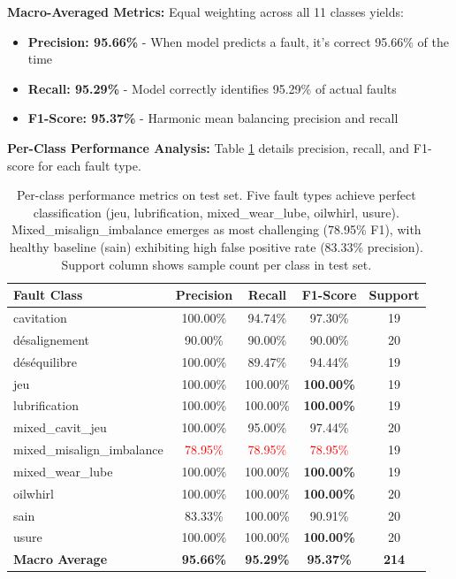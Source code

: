 \documentclass[11pt,a4paper]{article}
\begin{document}
\textbf{Macro-Averaged Metrics:} Equal weighting across all 11 classes yields:
\begin{itemize}[itemsep=0.2em]
    \item \textbf{Precision: 95.66\%} - When model predicts a fault, it's correct 95.66\% of the time
    \item \textbf{Recall: 95.29\%} - Model correctly identifies 95.29\% of actual faults
    \item \textbf{F1-Score: 95.37\%} - Harmonic mean balancing precision and recall
\end{itemize}

\textbf{Per-Class Performance Analysis:} Table \ref{tab:per_class} details precision, recall, and F1-score for each fault type.

\begin{table}[h]
\centering
\small
\begin{tabular}{@{}lcccc@{}}
\toprule
\textbf{Fault Class} & \textbf{Precision} & \textbf{Recall} & \textbf{F1-Score} & \textbf{Support} \\
\midrule
cavitation & 100.00\% & 94.74\% & 97.30\% & 19 \\
désalignement & 90.00\% & 90.00\% & 90.00\% & 20 \\
déséquilibre & 100.00\% & 89.47\% & 94.44\% & 19 \\
jeu & 100.00\% & 100.00\% & \textbf{100.00\%} & 19 \\
lubrification & 100.00\% & 100.00\% & \textbf{100.00\%} & 19 \\
mixed\_cavit\_jeu & 100.00\% & 95.00\% & 97.44\% & 20 \\
mixed\_misalign\_imbalance & \textcolor{red}{78.95\%} & \textcolor{red}{78.95\%} & \textcolor{red}{78.95\%} & 19 \\
mixed\_wear\_lube & 100.00\% & 100.00\% & \textbf{100.00\%} & 19 \\
oilwhirl & 100.00\% & 100.00\% & \textbf{100.00\%} & 20 \\
sain & 83.33\% & 100.00\% & 90.91\% & 20 \\
usure & 100.00\% & 100.00\% & \textbf{100.00\%} & 20 \\
\midrule
\textbf{Macro Average} & \textbf{95.66\%} & \textbf{95.29\%} & \textbf{95.37\%} & \textbf{214} \\
\bottomrule
\end{tabular}
\caption{Per-class performance metrics on test set. Five fault types achieve perfect classification (jeu, lubrification, mixed\_wear\_lube, oilwhirl, usure). Mixed\_misalign\_imbalance emerges as most challenging (78.95\% F1), with healthy baseline (sain) exhibiting high false positive rate (83.33\% precision). Support column shows sample count per class in test set.}
\label{tab:per_class}
\end{table}
\end{document}
